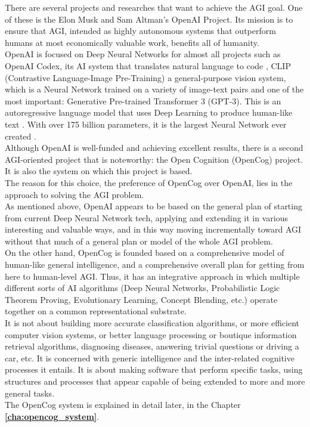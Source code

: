 There are several projects and researches that want to achieve the AGI goal. One of these is the Elon Musk and Sam Altman's OpenAI Project. 
Its mission is to ensure that AGI, intended as highly autonomous systems that outperform humans at most economically valuable work, benefits all of humanity. \\
OpenAI is focused on Deep Neural Networks for almost all projects such as OpenAI Codex, its AI system that translates natural language to code \cite{DBLP:journals/corr/abs-2107-03374}, CLIP (Contrastive Language-Image Pre-Training) a general-purpose vision system, which is a Neural Network trained on a variety of image-text pairs \cite{DBLP:journals/corr/abs-2103-00020} and one of the most important: Generative Pre-trained Transformer 3 (GPT-3). This is an autoregressive language model that uses Deep Learning to produce human-like text \cite{DBLP:journals/corr/abs-2005-14165}. With over 175 billion parameters, it is the largest Neural Network ever created \cite{romero_2021}. \\
Although OpenAI is well-funded and achieving excellent results, there is a second AGI-oriented project that is noteworthy: the Open Cognition (OpenCog) project. It is also the system on which this project is based. \\

The reason for this choice, the preference of OpenCog over OpenAI, lies in the approach to solving the AGI problem.\\
As mentioned above, OpenAI appears to be based on the general plan of starting from current Deep Neural Network tech, applying and extending it in various interesting and valuable ways, and in this way moving incrementally toward AGI without that much of a general plan or model of the whole AGI problem.\\ %
On the other hand, OpenCog is founded based on a comprehensive model of human-like general intelligence, and a comprehensive overall plan for getting from here to human-level AGI. Thus, it has an integrative approach in which multiple different sorts of AI algorithms (Deep Neural Networks, Probabilistic Logic Theorem Proving, Evolutionary Learning, Concept Blending, etc.) operate together on a common representational substrate. \\
It is not about building more accurate classification algorithms, or more efficient computer vision systems, or better language processing or boutique information retrieval algorithms, diagnosing diseases, answering trivial questions or driving a car, etc. It is concerned with generic intelligence and the inter-related cognitive processes it entails. It is about making software that perform specific tasks, using structures and processes that appear capable of being extended to more and more general tasks. \\ %
The OpenCog system is explained in detail later, in the Chapter \textbf{\ref{cha:opencog_system}}. \\

